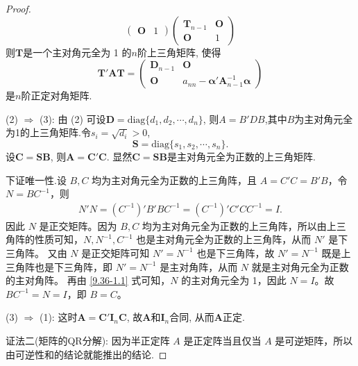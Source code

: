 \documentclass[../../main.tex]{subfiles}
\begin{document}
\begin{proof}
\[\begin{pmatrix}
\boldsymbol{O} & 1
\end{pmatrix}
\begin{pmatrix}
\boldsymbol{T}_{n - 1} & \boldsymbol{O} \\
\boldsymbol{O} & 1
\end{pmatrix}
\]
则$\boldsymbol{T}$是一个主对角元全为 1 的$n$阶上三角矩阵, 使得
\[
\boldsymbol{T}'\boldsymbol{A}\boldsymbol{T}=\begin{pmatrix}
\boldsymbol{D}_{n - 1} & \boldsymbol{O} \\
\boldsymbol{O} & a_{nn}-\boldsymbol{\alpha}'\boldsymbol{A}_{n - 1}^{-1}\boldsymbol{\alpha}
\end{pmatrix}
\]
是$n$阶正定对角矩阵.

(2) $\Rightarrow$ (3): 由 (2) 可设$\boldsymbol{D}=\text{diag}\{d_1, d_2, \cdots, d_n\}$, 则$A=B'DB$,其中$B$为主对角元全为1的上三角矩阵.令$s_i = \sqrt{d_i}>0$,
\[
\boldsymbol{S}=\text{diag}\{s_1, s_2, \cdots, s_n\}.
\]
设$\boldsymbol{C}=\boldsymbol{S}\boldsymbol{B}$, 则$\boldsymbol{A}=\boldsymbol{C}'\boldsymbol{C}$. 显然$\boldsymbol{C}=\boldsymbol{S}\boldsymbol{B}$是主对角元全为正数的上三角矩阵.

下证唯一性.设 \(B,C\) 均为主对角元全为正数的上三角阵，且 \(A = C'C = B'B\)，令 \(N = BC^{-1}\)，则
\begin{align}
N'N = \left( C^{-1} \right)'B'BC^{-1} = \left( C^{-1} \right)'C'CC^{-1} = I. \label{9.36-1.1}
\end{align}
因此 \(N\) 是正交矩阵。因为 \(B,C\) 均为主对角元全为正数的上三角阵，所以由上三角阵的性质可知，\(N,N^{-1},C^{-1}\) 也是主对角元全为正数的上三角阵，从而 \(N'\) 是下三角阵。
又由 \(N\) 是正交矩阵可知 \(N' = N^{-1}\) 也是下三角阵，故 \(N' = N^{-1}\) 既是上三角阵也是下三角阵，即 \(N' = N^{-1}\) 是主对角阵，从而 \(N\) 就是主对角元全为正数的主对角阵。
再由 \eqref{9.36-1.1} 式可知，\(N\) 的主对角元全为 1，因此 \(N = I\)。故 \(BC^{-1} = N = I\)，即 \(B = C\)。

(3) $\Rightarrow$ (1): 这时$\boldsymbol{A}=\boldsymbol{C}'\boldsymbol{I}_n\boldsymbol{C}$, 故$\boldsymbol{A}$和$\boldsymbol{I}_n$合同, 从而$\boldsymbol{A}$正定.

{\color{blue}证法二(矩阵的QR分解):}
因为半正定阵 $A$ 是正定阵当且仅当 $A$ 是可逆矩阵，所以由可逆性和的结论就能推出的结论.

\end{proof}
\end{document}
